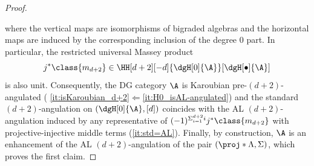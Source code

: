 \documentclass[a4paper]{amsart}
\begin{document}
\begin{proof}
\begin{center}
  \end{center}
  where the vertical maps are isomorphisms of bigraded algebras and the
  horizontal maps are induced by the corresponding inclusion of the degree $0$
  part. In particular, the restricted universal Massey product
  \[
    j^*\class{m_{d+2}}\in\HH[d+2][-d]{\dgH[0]{\A}}[\dgH[\bullet]{\A}]
  \]
  is also unit. Consequently, the DG category $\A$ is Karoubian
  pre-$(d+2)$-angulated (
  \eqref{it:isKaroubian_d+2}$\Leftarrow$\eqref{it:H0_isAL-angulated}) and the
  standard $(d+2)$-angulation on $(\dgH[0]{\A},[d])$ coincides with the AL
  $(d+2)$-angulation induced by any representative of $(-1)^{\Sigma_{i=1}^{d+2}i}j^*\class{m_{d+2}}$ with projective-injective middle terms
  (\eqref{it:std=AL}). Finally,
  by construction, $\A$ is an enhancement of the AL $(d+2)$-angulation of the
  pair $(\proj*{\Lambda},\Sigma)$, which proves the first claim.


\end{proof}
\end{document}
